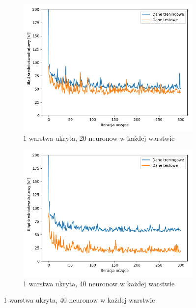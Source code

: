 \documentclass[12pt]{aghdpl}
\begin{document}
		\begin{figure}[h]
			\begin{subfigure}{.5\linewidth}
		 		\includegraphics[width =\linewidth]{wykresy/3_drugi_model_tworzenie_i_analiza/wykres_uczenia.png}
		 		\caption{1 warstwa ukryta, 20 neuronow w każdej warstwie}
		 	\end{subfigure}
		 	\begin{subfigure}{.5\linewidth}
		 		\includegraphics[width =\linewidth]{wykresy/4_zwiekszenie_stopnia_skomplikowania_modelu/1_warstwa_40_neuronow_wykres_uczenia.png}
		 		\caption{1 warstwa ukryta, 40 neuronow w każdej warstwie}
		 	\end{subfigure}
		 	

\end{figure}
\end{document}

